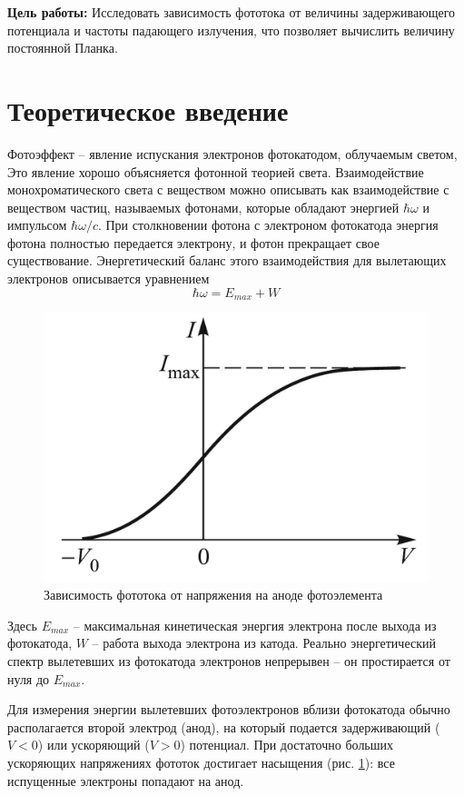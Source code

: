 \textbf{Цель работы:} Исследовать зависимость фототока от величины задерживающего потенциала и частоты падающего излучения, что позволяет вычислить величину постоянной Планка.
             
\section{Теоретическое введение}
    Фотоэффект -- явление испускания электронов фотокатодом, облучаемым светом,  Это явление хорошо объясняется фотонной теорией света. Взаимодействие монохроматического света с веществом можно описывать как взаимодействие с веществом частиц, называемых фотонами, которые обладают энергией $\hbar \omega$ и импульсом $\hbar \omega /c$. При столкновении фотона с электроном фотокатода энергия фотона полностью передается электрону, и фотон прекращает свое существование. Энергетический баланс этого взаимодействия для вылетающих электронов
	описывается уравнением
	\begin{equation}
        \label{energy balance}
	    \hbar \omega = E_{max} + W
	\end{equation}

    \begin{figure}[h!]
        \centering
        \includegraphics[width = 8.2 cm]{images/I_V_th}
        \caption{Зависимость фототока от напряжения на аноде фотоэлемента}
        \label{pict I(V)}
    \end{figure}
    
	Здесь $E_{max}$ -- максимальная кинетическая энергия электрона после выхода из фотокатода, $W$ -- работа выхода электрона из катода. Реально энергетический спектр вылетевших из фотокатода электронов непрерывен -- он простирается от нуля до $E_{max}$. 
	
	Для измерения энергии вылетевших фотоэлектронов вблизи фотокатода обычно располагается второй электрод (анод), на который подается задерживающий ($V < 0$) или ускоряющий ($V > 0$) потенциал. При достаточно больших ускоряющих напряжениях фототок достигает насыщения (рис. \ref{pict I(V)}): все испущенные электроны попадают на анод.
	
